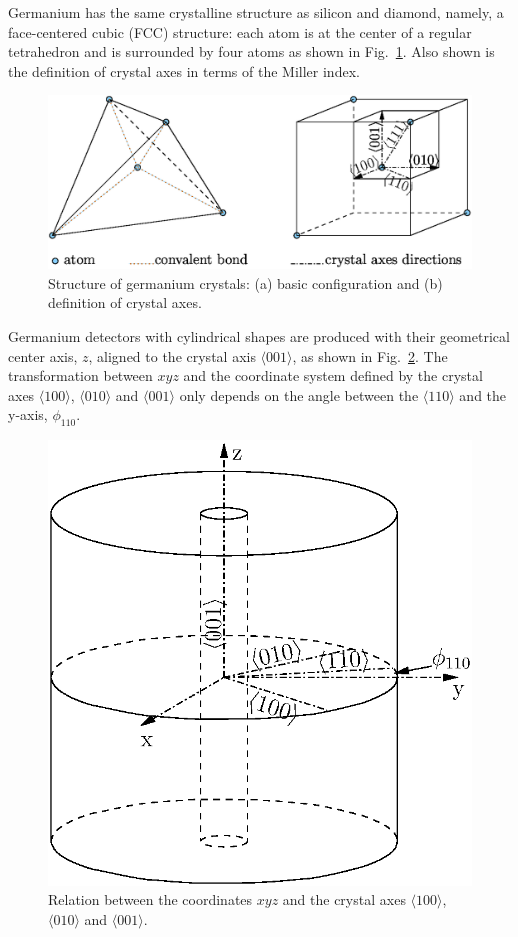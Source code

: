 \documentclass[epj,referee]{svjour}
\begin{document}
Germanium has the same crystalline structure as silicon and diamond,
namely, a face-centered cubic (FCC) structure: each atom is at the
center of a regular tetrahedron and is surrounded by four atoms as
shown in Fig.~\ref{f:xtal}. Also shown is the definition of crystal
axes in terms of the Miller index.
\begin{figure}[htpb]
\centering
\includegraphics[width=\linewidth]{xtalStruc}   
\caption{Structure of germanium crystals: (a) basic configuration and
(b) definition of crystal axes.}
\label{f:xtal} 
\end{figure} 

Germanium detectors with cylindrical shapes are produced with their
geometrical center axis, $z$, aligned to the crystal axis $\langle 001
\rangle$, as shown in Fig.~\ref{f:coo}. The transformation between
$xyz$ and the coordinate system defined by the crystal axes $\langle
100 \rangle$, $\langle 010 \rangle$ and $\langle 001 \rangle$ only
depends on the angle between the $\langle 110 \rangle$ and the y-axis,
$\phi_{110}$.
\begin{figure}[htpb]\sidecaption
\includegraphics[width=0.55\linewidth]{coordins}
\caption{Relation between the coordinates $xyz$ and the crystal
axes $\langle 100 \rangle$, $\langle 010 \rangle$ and $\langle 001
\rangle$.}
\label{f:coo} 
\end{figure} 
 
\end{document}
